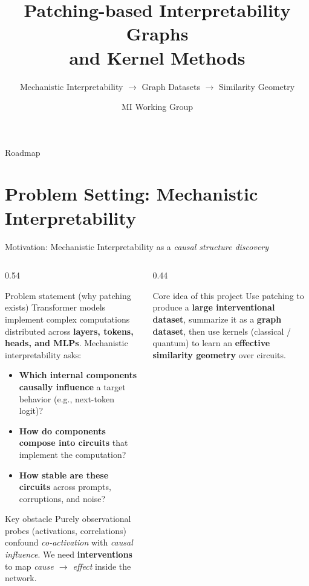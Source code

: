 \documentclass[aspectratio=169,xcolor={dvipsnames}]{beamer}
\title[Patching Kernels]{Patching-based Interpretability Graphs \\ and Kernel Methods}
\subtitle{Mechanistic Interpretability $\rightarrow$ Graph Datasets $\rightarrow$ Similarity Geometry}
\author{MI Working Group}
\institute{Uvigo}
\date{}
\renewcommand{\accent}[1]{\textbf{#1}}
\begin{document}
\frame{\titlepage}

\begin{frame}[shrink=16]{Roadmap}
\tableofcontents
\end{frame}

\section{Problem Setting: Mechanistic Interpretability}



\begin{frame}[shrink=20]{Motivation: Mechanistic Interpretability as a \emph{causal structure discovery}}
    \small
    \begin{columns}[T,onlytextwidth]
    \begin{column}{0.54\textwidth}
    \begin{block}{Problem statement (why patching exists)}
    Transformer models implement complex computations distributed across
    \accent{layers, tokens, heads, and MLPs}. Mechanistic interpretability asks:
    \begin{itemize}\setlength\itemsep{3pt}
    \item \accent{Which internal components causally influence} a target behavior (e.g., next-token logit)?
    \item \accent{How do components compose into circuits} that implement the computation?
    \item \accent{How stable are these circuits} across prompts, corruptions, and noise?
    \end{itemize}
    \end{block}

    \begin{block}{Key obstacle}
    Purely observational probes (activations, correlations) confound
    \emph{co-activation} with \emph{causal influence}. We need \accent{interventions}
    to map \emph{cause $\rightarrow$ effect} inside the network.
    \end{block}
    \end{column}

    \begin{column}{0.44\textwidth}
    \begin{block}{Core idea of this project}
    Use patching to produce a \accent{large interventional dataset}, summarize it
    as a \accent{graph dataset}, then use kernels (classical / quantum) to learn an
    \accent{effective similarity geometry} over circuits.
    \end{block}


\end{column}
\end{columns}
\end{frame}
\end{document}
